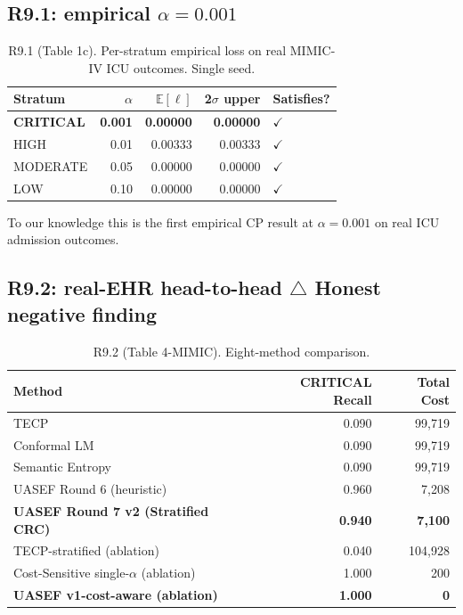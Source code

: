 \documentclass[11pt,letterpaper]{article}
\newcommand{\Ex}{\mathbb{E}}
\newcommand{\negfinding}{\textcolor{orange!90!black}{$\bm{\triangle}$ Honest negative finding}}
\begin{document}
\subsection{R9.1: empirical $\alpha = 0.001$}
\begin{table}[h!]
\centering
\caption{R9.1 (Table 1c). Per-stratum empirical loss on real MIMIC-IV ICU
outcomes. Single seed.}
\begin{tabular}{lrrrl}
\toprule
Stratum & $\alpha$ & $\Ex[\ell]$ & 2$\sigma$ upper & Satisfies? \\
\midrule
\textbf{CRITICAL} & \textbf{0.001} & \textbf{0.00000} & \textbf{0.00000} & \textbf{$\checkmark$} \\
HIGH & 0.01 & 0.00333 & 0.00333 & $\checkmark$ \\
MODERATE & 0.05 & 0.00000 & 0.00000 & $\checkmark$ \\
LOW & 0.10 & 0.00000 & 0.00000 & $\checkmark$ \\
\bottomrule
\end{tabular}
\end{table}

To our knowledge this is the first empirical CP result at $\alpha = 0.001$
on real ICU admission outcomes.

\subsection{R9.2: real-EHR head-to-head \negfinding}
\begin{table}[h!]
\centering
\caption{R9.2 (Table 4-MIMIC). Eight-method comparison.}
\begin{tabular}{lrr}
\toprule
Method & CRITICAL Recall & Total Cost \\
\midrule
TECP \cite{XuLuTECP2025} & 0.090 & 99{,}719 \\
Conformal LM \cite{Quach2024CLM} & 0.090 & 99{,}719 \\
Semantic Entropy \cite{Farquhar2024SE} & 0.090 & 99{,}719 \\
UASEF Round 6 (heuristic) & 0.960 & 7{,}208 \\
\textbf{UASEF Round 7 v2 (Stratified CRC)} & \textbf{0.940} & \textbf{7{,}100} \\
TECP-stratified (ablation) & 0.040 & 104{,}928 \\
Cost-Sensitive single-$\alpha$ (ablation) & 1.000 & 200 \\
\textbf{UASEF v1-cost-aware (ablation)} & \textbf{1.000} & \textbf{0} \\
\bottomrule
\end{tabular}
\end{table}
\end{document}
